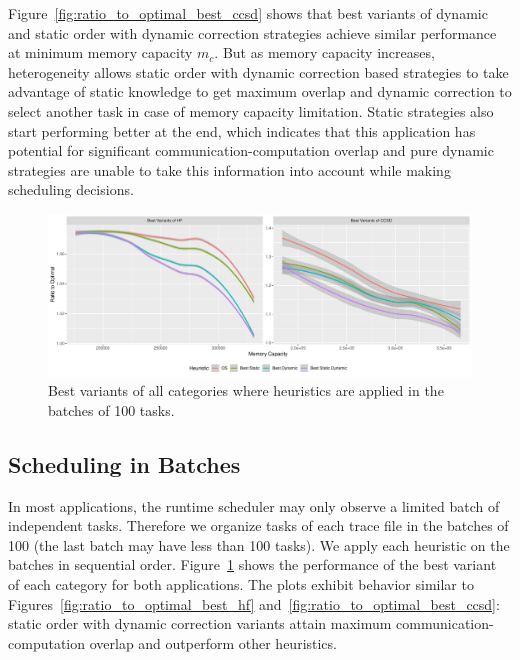 \documentclass[sigconf]{acmart}
\begin{document}
{		\noindent Figure~\ref{fig:ratio_to_optimal_best_ccsd} shows that best variants of dynamic and static order with dynamic correction strategies achieve similar performance at minimum memory capacity $m_c$. But as memory capacity increases, heterogeneity allows static order with dynamic correction based strategies to take advantage of static knowledge to get maximum overlap and dynamic correction to select another task in case of memory capacity limitation. Static strategies also start performing better at the end, which indicates that this application has potential for significant communication-computation overlap and pure dynamic strategies are unable to take this information into account while making scheduling decisions.
		

		
		\begin{figure}[!t]
			\includegraphics[scale=0.485]{./results/ratio_to_optimal_batch-best.pdf}
			\vspace*{-0.5cm}\caption{Best variants of all categories where heuristics are applied in the batches of 100 tasks.\vspace*{-0.1cm}}
			\label{fig:best_variants_batch}
		\end{figure}		
		
		\subsection{Scheduling in Batches}
				

		In most applications, the runtime scheduler may only observe a limited batch of independent tasks. Therefore we organize tasks of each trace file in the batches of 100 (the last batch may have less than 100 tasks). We apply each heuristic on the batches in sequential order. Figure~\ref{fig:best_variants_batch} shows the performance of the best variant of each category for both applications. The plots exhibit behavior similar to Figures~\ref{fig:ratio_to_optimal_best_hf} and~\ref{fig:ratio_to_optimal_best_ccsd}: static order with dynamic correction variants attain maximum communication-computation overlap and outperform other heuristics.

}
\end{document}
